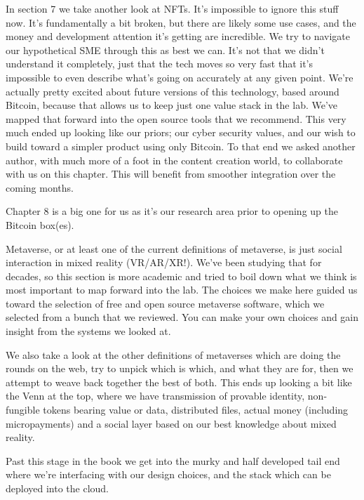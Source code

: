 In section 7 we take another look at NFTs. It’s impossible to ignore this stuff now. It’s fundamentally a bit broken, but there are likely some use cases, and the money and development attention it’s getting are incredible. We try to navigate our hypothetical SME through this as best we can. It’s not that we didn’t understand it completely, just that the tech moves so very fast that it’s impossible to even describe what’s going on accurately at any given point. We’re actually pretty excited about future versions of this technology, based around Bitcoin, because that allows us to keep just one value stack in the  lab. We’ve mapped that forward into the open source tools that we recommend. This very much ended up looking like our priors; our cyber security values, and our wish to build toward a simpler product using only Bitcoin. To that end we asked another author, with much more of a foot in the content creation world, to collaborate with us on this chapter. This will benefit from smoother integration over the coming months.\par
Chapter 8 is a big one for us as it’s our research area prior to opening up the Bitcoin box(es).\par Metaverse, or at least one of the current definitions of metaverse, is just social interaction in mixed reality (VR/AR/XR!). We’ve been studying that for decades, so this section is more academic and tried to boil down what we think is most important to map forward into the lab. The choices we make here guided us toward the selection of free and open source metaverse software, which we selected from a bunch that we reviewed. You can make your own choices and gain insight from the systems we looked at.\par
We also take a look at the other definitions of metaverses which are doing the rounds on the web, try to unpick which is which, and what they are for, then we attempt to weave back together the best of both. This ends up looking a bit like the Venn at the top, where we have transmission of provable identity, non-fungible tokens bearing value or data, distributed files, actual money (including micropayments) and a social layer based on our best knowledge about mixed reality.\par
Past this stage in the book we get into the murky and half developed tail end where we’re interfacing with our design choices, and the stack which can be deployed into the cloud.


